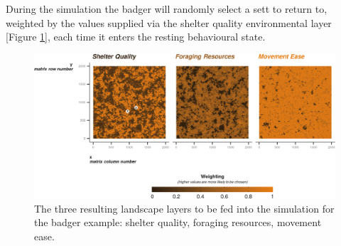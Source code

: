 \documentclass[10pt,a4paper]{article}
\newenvironment{Shaded}{}{}
\newcommand{\AttributeTok}[1]{#1}
\newcommand{\ConstantTok}[1]{#1}
\newcommand{\DecValTok}[1]{#1}
\newcommand{\FloatTok}[1]{#1}
\newcommand{\FunctionTok}[1]{#1}
\newcommand{\NormalTok}[1]{#1}
\newcommand{\OtherTok}[1]{#1}
\newcommand{\SpecialCharTok}[1]{#1}
\newcommand{\StringTok}[1]{#1}
\begin{document}
\begin{Shaded}
\end{Shaded}

During the simulation the badger will randomly select a sett to return to, weighted by the values supplied via the shelter quality environmental layer {[}Figure \ref{fig:BADGERlayersFigure}{]}, each time it enters the resting behavioural state.

\begin{figure}

{\centering \includegraphics{Agent-based_model_walkthrough_files/figure-latex/BADGERlayersFigure-1} 

}

\caption{The three resulting landscape layers to be fed into the simulation for the badger example: shelter quality, foraging resources, movement ease.}\label{fig:BADGERlayersFigure}
\end{figure}
\end{document}
